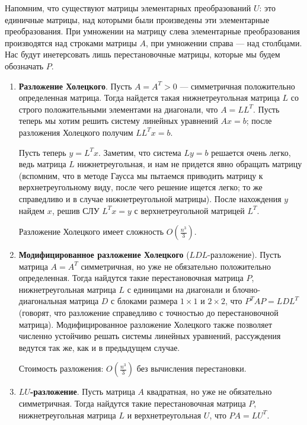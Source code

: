 \documentclass[a4paper, 12pt]{article}
\begin{document}
Напомним, что существуют матрицы элементарных преобразований $U$: это единичные матрицы, над которыми были произведены эти элементарные преобразования. При умножении на матрицу слева элементарные преобразования производятся над строками матрицы $A$, при умножении справа --- над столбцами. Нас будут инетерсовать лишь перестановочные матрицы, которые мы будем обозначать $P$.

\begin{enumerate}
    \item \textbf{Разложение Холецкого}. Пусть $A = A^T > 0$ --- симметричная положительно определенная матрица. Тогда найдется такая нижнетреугольная матрица $L$ со строго положительными элементами на диагонали, что $A = LL^T$. Пусть теперь мы хотим решить систему линейных уравнений $Ax = b$; после разложения Холецкого получим $LL^T x = b$.
    
    Пусть теперь $y = L^Tx$. Заметим, что система $Ly = b$ решается очень легко, ведь матрица $L$ нижнетреугольная, и нам не придется явно обращать матрицу (вспомним, что в методе Гаусса мы пытаемся приводить матрицу к верхнетреугольному виду, после чего решение ищется легко; то же справедливо и в случае нижнетреугольной матрицы). После нахождения $y$ найдем $x$, решив СЛУ $L^Tx = y$ с верхнетреугольной матрицей $L^T$.
    
    Разложение Холецкого имеет сложность $O\left(\frac{n^3}{3}\right)$.
    
    \item \textbf{Модифицированное разложение Холецкого} ($LDL$-разложение). Пусть матрица $A = A^T$ симметричная, но уже не обязательно положительно определенная. Тогда найдутся такие перестановочная матрица $P$, нижнетреугольная матрица $L$ с единицами на диагонали и блочно-диагональная матрица $D$ с блоками размера $1\times 1$ и $2 \times 2$, что $P^TAP = LDL^T$ (говорят, что разложение справедливо с точностью до перестановочной матрица). Модифицированное разложение Холецкого также позволяет численно устойчиво решать системы линейных уравнений, рассуждения ведутся так же, как и в предыдущем случае.
    
    Стоимость разложения: $O\left(\frac{n^3}{3}\right)$ без вычисления перестановки.
    
    \item \textbf{$LU$-разложение}. Пусть матрица $A$ квадратная, но уже не обязательно симметричная. Тогда найдутся такие перестановочная матрица $P$, нижнетреугольная матрица $L$ и верхнетреугольная $U$, что $PA = LU^T$.
    

\end{enumerate}
\end{document}
